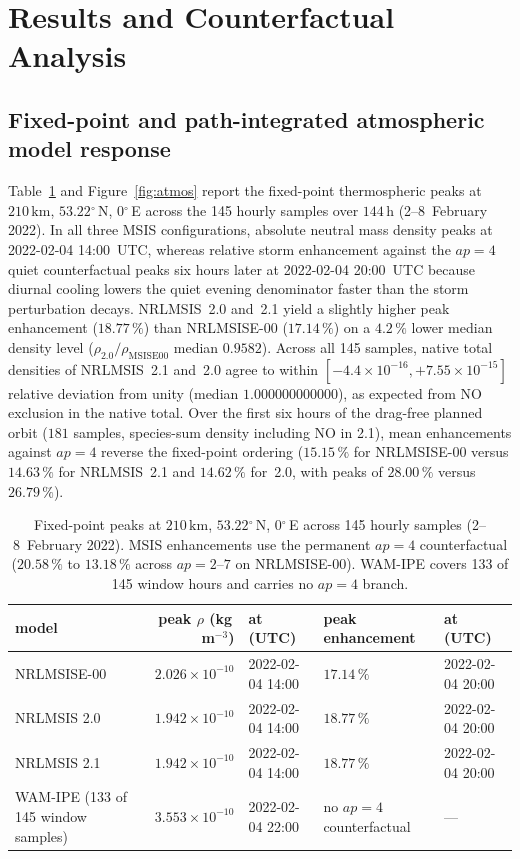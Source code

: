 \documentclass[12pt]{article}
\newcommand{\unit}[1]{\,\mathrm{#1}}
\newcommand{\degree}{\ensuremath{{}^\circ}}
\begin{document}
\section{Results and Counterfactual Analysis}
\label{sec:results}

\subsection{Fixed-point and path-integrated atmospheric model response}
\label{sec:res-atmos}

Table~\ref{tab:atmos} and Figure~\ref{fig:atmos} report the fixed-point thermospheric peaks at $210\unit{km}$, $53.22\degree$\,N, $0\degree$\,E across the 145 hourly samples over $144\unit{h}$ (2--8~February 2022). In all three MSIS configurations, absolute neutral mass density peaks at 2022-02-04 14:00~UTC, whereas relative storm enhancement against the $ap=4$ quiet counterfactual peaks six hours later at 2022-02-04 20:00~UTC because diurnal cooling lowers the quiet evening denominator faster than the storm perturbation decays. NRLMSIS~2.0 and~2.1 yield a slightly higher peak enhancement ($18.77\,\%$) than NRLMSISE-00 ($17.14\,\%$) on a $4.2\,\%$ lower median density level ($\rho_{2.0}/\rho_{\mathrm{MSISE00}}$ median $0.9582$). Across all 145 samples, native total densities of NRLMSIS~2.1 and~2.0 agree to within $[-4.4\times10^{-16}, +7.55\times10^{-15}]$ relative deviation from unity (median $1.000000000000$), as expected from NO exclusion in the native total. Over the first six hours of the drag-free planned orbit ($181$ samples, species-sum density including NO in 2.1), mean enhancements against $ap=4$ reverse the fixed-point ordering ($15.15\,\%$ for NRLMSISE-00 versus $14.63\,\%$ for NRLMSIS~2.1 and $14.62\,\%$ for~2.0, with peaks of $28.00\,\%$ versus $26.79\,\%$).

\begin{table}[htbp]
\centering
\caption{Fixed-point peaks at $210\unit{km}$, $53.22\degree$\,N, $0\degree$\,E across 145 hourly samples (2--8~February 2022). MSIS enhancements use the permanent $ap=4$ counterfactual ($20.58\,\%$ to $13.18\,\%$ across $ap=2$--$7$ on NRLMSISE-00). WAM-IPE covers 133 of 145 window hours and carries no $ap=4$ branch.}
\label{tab:atmos}
\small
\begin{tabular}{p{3.8cm}rlp{2.6cm}l}
\toprule
model & peak $\rho$ (kg\,m$^{-3}$) & at (UTC) & peak enhancement & at (UTC) \\
\midrule
NRLMSISE-00 & $2.026 \times 10^{-10}$ & 2022-02-04 14:00 & $17.14\,\%$ & 2022-02-04 20:00 \\
NRLMSIS 2.0 & $1.942 \times 10^{-10}$ & 2022-02-04 14:00 & $18.77\,\%$ & 2022-02-04 20:00 \\
NRLMSIS 2.1 & $1.942 \times 10^{-10}$ & 2022-02-04 14:00 & $18.77\,\%$ & 2022-02-04 20:00 \\
WAM-IPE (133 of 145 window samples) & $3.553 \times 10^{-10}$ & 2022-02-04 22:00 & no $ap=4$ counterfactual & --- \\
\bottomrule
\end{tabular}
\end{table}
\end{document}
